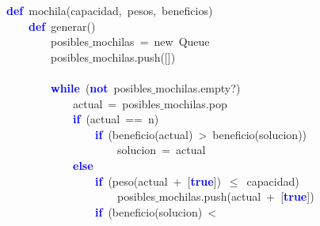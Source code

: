 \noindent
\mbox{}\textbf{\textcolor{Blue}{def}}\ mochila\textcolor{BrickRed}{(}capacidad\textcolor{BrickRed}{,}\ pesos\textcolor{BrickRed}{,}\ beneficios\textcolor{BrickRed}{)} \\
\mbox{}\ \ \ \ \textbf{\textcolor{Blue}{def}}\ generar\textcolor{BrickRed}{()} \\
\mbox{}\ \ \ \ \ \ \ \ posibles$\_$mochilas\ \textcolor{BrickRed}{=}\ new\ Queue \\
\mbox{}\ \ \ \ \ \ \ \ posibles$\_$mochilas\textcolor{BrickRed}{.}push\textcolor{BrickRed}{([])} \\
\mbox{} \\
\mbox{}\ \ \ \ \ \ \ \ \textbf{\textcolor{Blue}{while}}\ \textcolor{BrickRed}{(}\textbf{\textcolor{Blue}{not}}\ posibles$\_$mochilas\textcolor{BrickRed}{.}empty?\textcolor{BrickRed}{)} \\
\mbox{}\ \ \ \ \ \ \ \ \ \ \ \ actual\ \textcolor{BrickRed}{=}\ posibles$\_$mochilas\textcolor{BrickRed}{.}pop \\
\mbox{}\ \ \ \ \ \ \ \ \ \ \ \ \textbf{\textcolor{Blue}{if}}\ \textcolor{BrickRed}{(}actual\ \textcolor{BrickRed}{==}\ n\textcolor{BrickRed}{)} \\
\mbox{}\ \ \ \ \ \ \ \ \ \ \ \ \ \ \ \ \textbf{\textcolor{Blue}{if}}\ \textcolor{BrickRed}{(}beneficio\textcolor{BrickRed}{(}actual\textcolor{BrickRed}{)}\ \textcolor{BrickRed}{\textgreater{}}\ beneficio\textcolor{BrickRed}{(}solucion\textcolor{BrickRed}{))} \\
\mbox{}\ \ \ \ \ \ \ \ \ \ \ \ \ \ \ \ \ \ \ \ solucion\ \textcolor{BrickRed}{=}\ actual \\
\mbox{}\ \ \ \ \ \ \ \ \ \ \ \ \textbf{\textcolor{Blue}{else}} \\
\mbox{}\ \ \ \ \ \ \ \ \ \ \ \ \ \ \ \ \textbf{\textcolor{Blue}{if}}\ \textcolor{BrickRed}{(}peso\textcolor{BrickRed}{(}actual\ \textcolor{BrickRed}{+}\ \textcolor{BrickRed}{[}\textbf{\textcolor{Blue}{true}}\textcolor{BrickRed}{])}\ \textcolor{BrickRed}{$\le$}\ capacidad\textcolor{BrickRed}{)} \\
\mbox{}\ \ \ \ \ \ \ \ \ \ \ \ \ \ \ \ \ \ \ \ posibles$\_$mochilas\textcolor{BrickRed}{.}push\textcolor{BrickRed}{(}actual\ \textcolor{BrickRed}{+}\ \textcolor{BrickRed}{[}\textbf{\textcolor{Blue}{true}}\textcolor{BrickRed}{])} \\
\mbox{}\ \ \ \ \ \ \ \ \ \ \ \ \ \ \ \ \textbf{\textcolor{Blue}{if}}\ \textcolor{BrickRed}{(}beneficio\textcolor{BrickRed}{(}solucion\textcolor{BrickRed}{)}\ \textcolor{BrickRed}{\textless{}}\\
